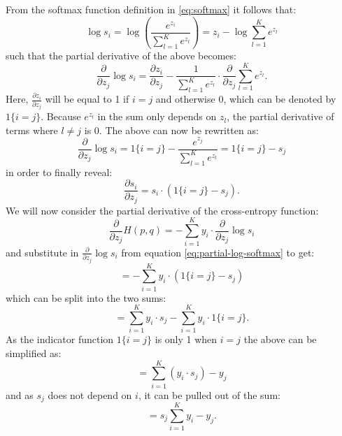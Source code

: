 \documentclass[a4paper,11pt]{article}
\begin{document}
From the softmax function definition in \ref{eq:softmax} it follows that:
\begin{equation}
  \log s_i = \log \left( \frac{e^{z_i}}{\sum_{l=1}^{K}{e^{z_l}}}  \right) = z_i - \log  \sum_{l=1}^{K}{e^{z_l}}
\end{equation}
such that the partial derivative of the above becomes:
\begin{equation}
  \frac{\partial}{\partial z_j} \log s_i = \frac{\partial z_i}{\partial z_j} - \frac{1}{\sum_{l=1}^{K}{e^{z_l}}} \cdot \frac{\partial}{\partial z_j} \sum_{l=1}^{K}{ e^{z_l}}.
\end{equation}
Here, $\frac{\partial z_i}{\partial z_j}$ will be equal to 1 if $i=j$ and otherwise 0, which can be denoted by $1\{i = j\}$. Because $e^{z_l}$ in the sum only depends on $z_l$, the partial derivative of terms where $l\neq j$ is 0. The above can now be rewritten as:
\begin{equation} \label{eq:partial-log-softmax}
  \frac{\partial}{\partial z_j} \log s_i = 1\{ i = j \} - \frac{e^{z_j}}{\sum_{l=1}^{K}{ e^{z_l}}} = 1\{ i = j \} - s_j
\end{equation}
in order to finally reveal:
\begin{equation}
  \frac{\partial s_i}{\partial z_j} = s_i \cdot \left( 1\{ i = j \} - s_j \right).
\end{equation}
We will now consider the partial derivative of the cross-entropy function:
\begin{equation}
  \frac{\partial}{\partial z_j} H(p, q) = - \sum_{i=1}^{K} y_{i} \cdot \frac{\partial}{\partial z_j} \log s_i
\end{equation}
and substitute in $\frac{\partial}{\partial z_j} \log s_i$ from equation \ref{eq:partial-log-softmax} to get:
\begin{equation}
  = - \sum_{i=1}^{K} y_{i} \cdot \left( 1\{ i = j \} - s_j \right)
\end{equation}
which can be split into the two sums:
\begin{equation}
  = \sum_{i=1}^{K}{y_{i} \cdot s_j} - \sum_{i=1}^{K}{y_{i} \cdot 1\{ i = j \}}.
\end{equation}
As the indicator function $1\{i=j\}$ is only 1 when $i=j$ the above can be simplified as:
\begin{equation}
  = \sum_{i=1}^{K}{\left( y_{i} \cdot s_j \right)} - y_{j}
\end{equation}
and as $s_j$ does not depend on $i$, it can be pulled out of the sum:
\begin{equation}
  = s_j \sum_{i=1}^{K}{ y_{i} } - y_{j}.
\end{equation}
\end{document}
